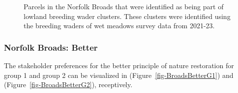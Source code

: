 \documentclass[
  12pt,
  letterpaper,
  DIV=11,
  numbers=noendperiod]{scrartcl}
\begin{document}
\begin{figure}[H]


\caption{\label{fig-BroadsLawton}Parcels in the Norfolk Broads that were
identified as being part of lowland breeding wader clusters. These
clusters were identified using the breeding waders of wet meadows survey
data from 2021-23.}

\end{figure}%

\newpage{}

\subsubsection{Norfolk Broads: Better}\label{norfolk-broads-better}

The stakeholder preferences for the better principle of nature
restoration for group 1 and group 2 can be visualized in
(Figure~\ref{fig-BroadsBetterG1}) and (Figure~\ref{fig-BroadsBetterG2}),
receptively.
\end{document}
